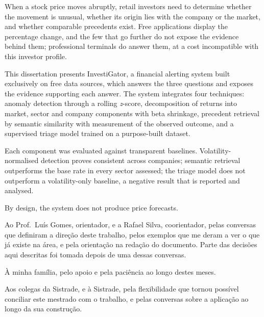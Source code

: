 \begin{abstractotherlanguage}
When a stock price moves abruptly, retail investors need to determine whether the movement is
unusual, whether its origin lies with the company or the market, and whether comparable precedents
exist. Free applications display the percentage change, and the few that go further do not
expose the evidence behind them;
professional terminals do answer them, at a cost incompatible with this investor profile.

This dissertation presents InvestiGator, a financial alerting system built exclusively on free data
sources, which answers the three questions and exposes the evidence supporting each answer. The
system integrates four techniques: anomaly detection through a rolling \emph{z}-score, decomposition
of returns into market, sector and company components with beta shrinkage, precedent retrieval by
semantic similarity with measurement of the observed outcome, and a supervised triage model trained
on a purpose-built dataset.

Each component was evaluated against transparent baselines. Volatility-normalised detection proves
consistent across companies; semantic retrieval outperforms the base rate in every sector assessed;
the triage model does not outperform a volatility-only baseline, a negative result that is reported
and analysed.

By design, the system does not produce price forecasts.
\end{abstractotherlanguage}
%
\begin{acknowledgements}
Ao Prof.\ Luís Gomes, orientador, e a Rafael Silva, coorientador, pelas conversas que
definiram a direção deste trabalho, pelos exemplos que me deram a ver o que já existe na
área, e pela orientação na redação do documento. Parte das decisões aqui descritas foi
tomada depois de uma dessas conversas.

À minha família, pelo apoio e pela paciência ao longo destes meses.

Aos colegas da Sistrade, e à Sistrade, pela flexibilidade que tornou possível conciliar
este mestrado com o trabalho, e pelas conversas sobre a aplicação ao longo da sua
construção.
\end{acknowledgements}

